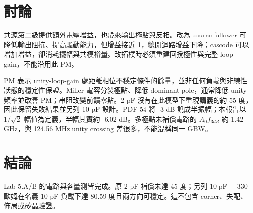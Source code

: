 \section{討論}
共源第二級提供額外電壓增益，也帶來輸出極點與反相。改為 source follower 可降低輸出阻抗、提高驅動能力，但增益接近 1，總開迴路增益下降；cascode 可以增加增益，卻消耗擺幅與共模裕量。改拓樸時必須重建回授極性與完整 loop gain，不能沿用此 PM。

PM 表示 unity-loop-gain 處距離相位不穩定條件的餘量，並非任何負載與非線性狀態的穩定性保證。Miller 電容分裂極點、降低 dominant pole，通常降低 unity 頻率並改善 PM；串阻改變前饋零點。2 pF 沒有在此模型下重現講義的約 55 度，因此保留失敗結果並另列 10 pF 設計。PDF 54 將 -3 dB 說成半振幅；本報告以 $1/\sqrt2$ 幅值為定義，半幅其實約 -6.02 dB。多極點未補償電路的 $A_0f_{3dB}$ 約 1.42 GHz，與 124.56 MHz unity crossing 差很多，不能混稱同一 GBW。

\section{結論}
Lab 5.A/B 的電路與各量測皆完成。原 2 pF 補償未達 45 度；另列 10 pF + 330 歐姆在名義 10 pF 負載下達 80.59 度且兩方向可穩定。這不包含 corner、失配、佈局或矽晶驗證。


